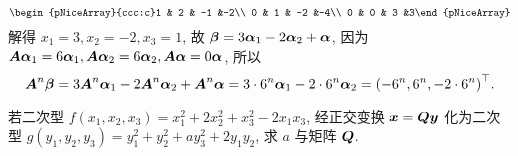 \begin{solution}
\begin{enumerate}[label=(\arabic{*})]
$$        \begin{pNiceArray}{ccc:c}1 & 2 & -1 &-2\\ 0 & 1 & -2 &-4\\ 0 & 0 & 3 &3\end{pNiceArray}
        $$
        解得 $x_1=3, x_2=-2, x_3=1$, 故 $\vb*{\beta}=3\vb*{\alpha}_1-2\vb*{\alpha}_2+\vb*{\alpha}$, 因为 $\vb*{A\alpha}_1=6\vb*{\alpha}_1, \vb*{A\alpha}_2=6\vb*{\alpha}_2, \vb*{A\alpha}=0\vb*{\alpha}$, 所以
        $$\vb*{A}^{n}\vb*{\beta}=3\vb*{A}^{n}\vb*{\alpha}_1-2\vb*{A}^{n}\vb*{\alpha}_2+\vb*{A}^{n}\vb*{\alpha}=3\cdot 6^{n}\vb*{\alpha}_1-2\cdot 6^{n}\vb*{\alpha}_2=\qty(-6^{n},6^{n},-2\cdot 6^{n})^{\top}.$$
    \end{enumerate}
\end{solution}

\begin{example}
    若二次型 $f(x_1, x_2, x_3)=x_1^2+2x_2^2+x_3^2-2x_1x_3$, 经正交变换 $\vb*{x}=\vb*{Qy}$ 化为二次型 $g(y_1, y_2, y_3)=y_1^2+y_2^2+ay_3^2+2y_1y_2$, 求 $a$ 与矩阵 $\vb*{Q}$.
\end{example}
